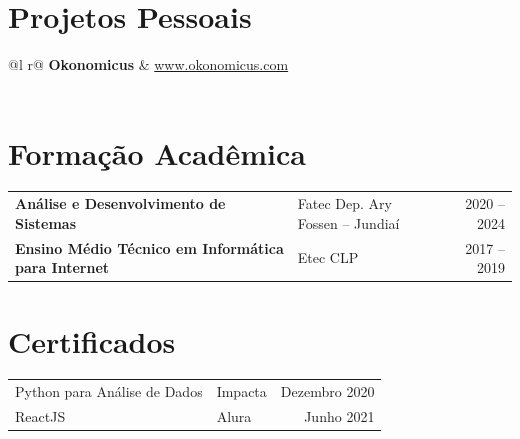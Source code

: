\documentclass[a4paper,11pt]{article}
\begin{document}
\section{Projetos Pessoais}

\begin{tabularx}{\linewidth}{ @{}l r@{} }
\textbf{\color{darkblue}Okonomicus} & \hfill \href{https://www.okonomicus.com}{\small www.okonomicus.com} \\[3pt]
  \\[8pt]

\end{tabularx}

\section{Formação Acadêmica}

\begin{tabularx}{\linewidth}{@{}l X r@{}}
\textbf{Análise e Desenvolvimento de Sistemas} & \small Fatec Dep. Ary Fossen -- Jundiaí & 2020 -- 2024 \\[3pt]
\textbf{Ensino Médio Técnico em Informática para Internet} & \small Etec CLP & 2017 -- 2019 \\
\end{tabularx}

\section{Certificados}

\begin{tabularx}{\linewidth}{@{}l X r@{}}
Python para Análise de Dados & \small Impacta & Dezembro 2020 \\[3pt]
ReactJS & \small Alura & Junho 2021 \\
\end{tabularx}

\vfill
{}
\end{document}
